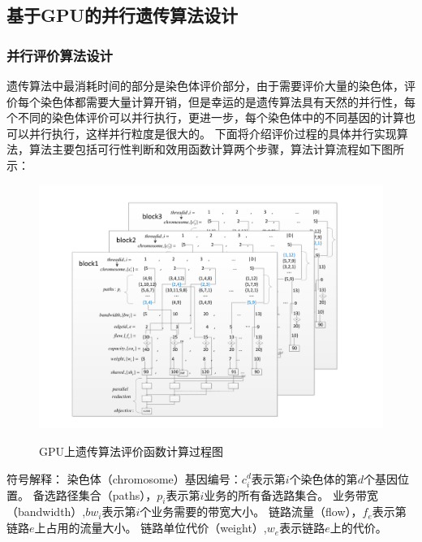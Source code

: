 \subsection{基于GPU的并行遗传算法设计}
\subsubsection{并行评价算法设计}
  遗传算法中最消耗时间的部分是染色体评价部分，由于需要评价大量的染色体，评价每个染色体都需要大量计算开销，但是幸运的是遗传算法具有天然的并行性，每个不同的染色体评价可以并行执行，更进一步，每个染色体中的不同基因的计算也可以并行执行，这样并行粒度是很大的。
  下面将介绍评价过程的具体并行实现算法，算法主要包括可行性判断和效用函数计算两个步骤，算法计算流程如下图所示：
\begin{figure}
  \begin{center}
    {\includegraphics[width=1 \textwidth]{figures/GPUfitness.pdf}}
    \end{center}
  \caption{{\footnotesize{GPU上遗传算法评价函数计算过程图}}}
  \label{IterNum}
\end{figure}
符号解释：\newline
染色体（chromosome）基因编号：$c^d_i$表示第$i$个染色体的第$d$个基因位置。\newline
备选路径集合（paths），$p_i$表示第$i$业务的所有备选路集合。\newline
业务带宽（bandwidth）,$bw_i$表示第$i$个业务需要的带宽大小。\newline
链路流量（flow），$f_e$表示第链路$e$上占用的流量大小。\newline
链路单位代价（weight）,$w_e$表示链路$e$上的代价。\newline
